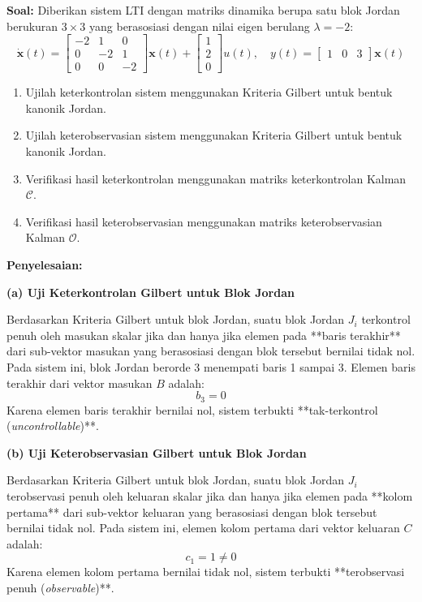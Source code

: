 \documentclass[11pt,a4paper]{article}
\begin{document}
\textbf{Soal:}  
Diberikan sistem LTI dengan matriks dinamika berupa satu blok Jordan berukuran $3 \times 3$ yang berasosiasi dengan nilai eigen berulang $\lambda = -2$:
$$\dot{\mathbf{x}}(t) = \begin{bmatrix} -2 & 1 & 0 \\ 0 & -2 & 1 \\ 0 & 0 & -2 \end{bmatrix} \mathbf{x}(t) + \begin{bmatrix} 1 \\ 2 \\ 0 \end{bmatrix} u(t), \quad y(t) = \begin{bmatrix} 1 & 0 & 3 \end{bmatrix} \mathbf{x}(t)$$
\begin{enumerate}[label=(\alph*)]
    \item Ujilah keterkontrolan sistem menggunakan Kriteria Gilbert untuk bentuk kanonik Jordan.
    \item Ujilah keterobservasian sistem menggunakan Kriteria Gilbert untuk bentuk kanonik Jordan.
    \item Verifikasi hasil keterkontrolan menggunakan matriks keterkontrolan Kalman $\mathcal{C}$.
    \item Verifikasi hasil keterobservasian menggunakan matriks keterobservasian Kalman $\mathcal{O}$.
\end{enumerate}

\textbf{Penyelesaian:}

\textbf{(a) Uji Keterkontrolan Gilbert untuk Blok Jordan}

Berdasarkan Kriteria Gilbert untuk blok Jordan, suatu blok Jordan $J_i$ terkontrol penuh oleh masukan skalar jika dan hanya jika elemen pada **baris terakhir** dari sub-vektor masukan yang berasosiasi dengan blok tersebut bernilai tidak nol.
Pada sistem ini, blok Jordan berorde 3 menempati baris 1 sampai 3. Elemen baris terakhir dari vektor masukan $B$ adalah:
$$b_3 = 0$$
Karena elemen baris terakhir bernilai nol, sistem terbukti **tak-terkontrol (\textit{uncontrollable})**.

\textbf{(b) Uji Keterobservasian Gilbert untuk Blok Jordan}

Berdasarkan Kriteria Gilbert untuk blok Jordan, suatu blok Jordan $J_i$ terobservasi penuh oleh keluaran skalar jika dan hanya jika elemen pada **kolom pertama** dari sub-vektor keluaran yang berasosiasi dengan blok tersebut bernilai tidak nol.
Pada sistem ini, elemen kolom pertama dari vektor keluaran $C$ adalah:
$$c_1 = 1 \ne 0$$
Karena elemen kolom pertama bernilai tidak nol, sistem terbukti **terobservasi penuh (\textit{observable})**.
\end{document}
